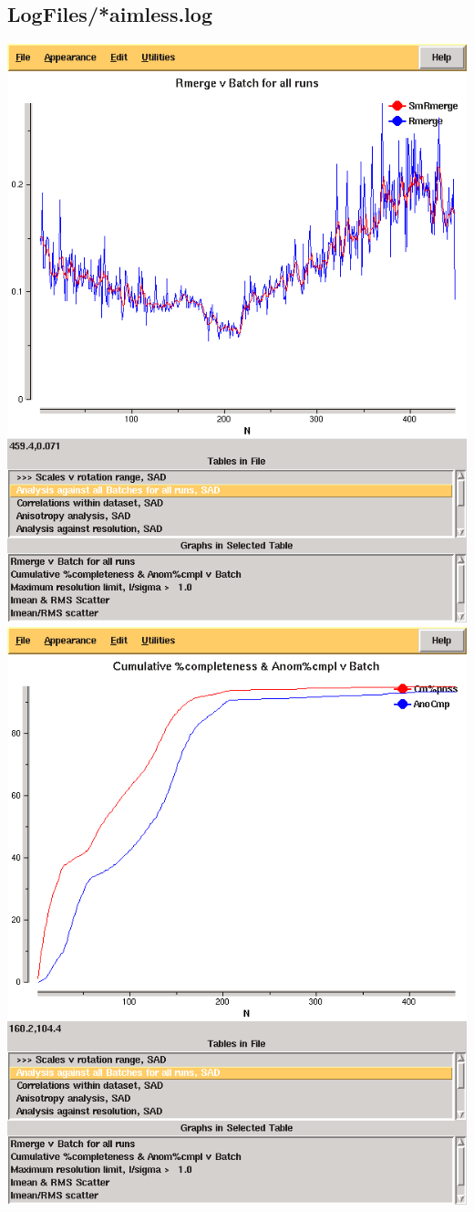 \documentclass[a4paper, 11pt]{article}
\begin{document}
\subsection{LogFiles/*aimless.log}
\includegraphics[scale=0.25]{figures/3qrn-all-rmerge-aimless.png}
\includegraphics[scale=0.25]{figures/3qrn-all-complete-aimless.png}
\end{document}
